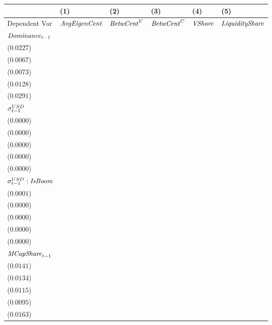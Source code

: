 \begin{tabular}{llllll}
\toprule
{} &                                       (1) &                                       (2) &                                       (3) &                                       (4) &                                       (5) \\
\midrule
Dependent Var                           &                      ${\it AvgEigenCent}$ &                        ${\it BetwCent}^V$ &                        ${\it BetwCent}^C$ &                            ${\it VShare}$ &                    ${\it LiquidityShare}$ \\
$\it Dominance_{t-1}$                   &   \makecell{$0.8349^{***}$ \\ ($0.0227$)} &   \makecell{$0.9507^{***}$ \\ ($0.0067$)} &   \makecell{$0.9515^{***}$ \\ ($0.0073$)} &   \makecell{$0.8831^{***}$ \\ ($0.0128$)} &   \makecell{$0.9222^{***}$ \\ ($0.0291$)} \\
${\it \sigma}^{USD}_{t-1}$              &   \makecell{$-0.0001^{**}$ \\ ($0.0000$)} &      \makecell{$0.0000^{}$ \\ ($0.0000$)} &      \makecell{$0.0000^{}$ \\ ($0.0000$)} &   \makecell{$-0.0000^{**}$ \\ ($0.0000$)} &   \makecell{$-0.0000^{**}$ \\ ($0.0000$)} \\
${\it \sigma}^{USD}_{t-1}:{\it IsBoom}$ &   \makecell{$0.0002^{***}$ \\ ($0.0001$)} &     \makecell{$-0.0000^{}$ \\ ($0.0000$)} &     \makecell{$-0.0000^{}$ \\ ($0.0000$)} &   \makecell{$0.0000^{***}$ \\ ($0.0000$)} &    \makecell{$0.0000^{**}$ \\ ($0.0000$)} \\
${\it MCapShare}_{t-1}$                 &      \makecell{$0.0124^{}$ \\ ($0.0141$)} &    \makecell{$0.0333^{**}$ \\ ($0.0134$)} &   \makecell{$0.0360^{***}$ \\ ($0.0115$)} &   \makecell{$0.0311^{***}$ \\ ($0.0095$)} &   \makecell{$0.0429^{***}$ \\ ($0.0163$)} \\

\end{tabular}
